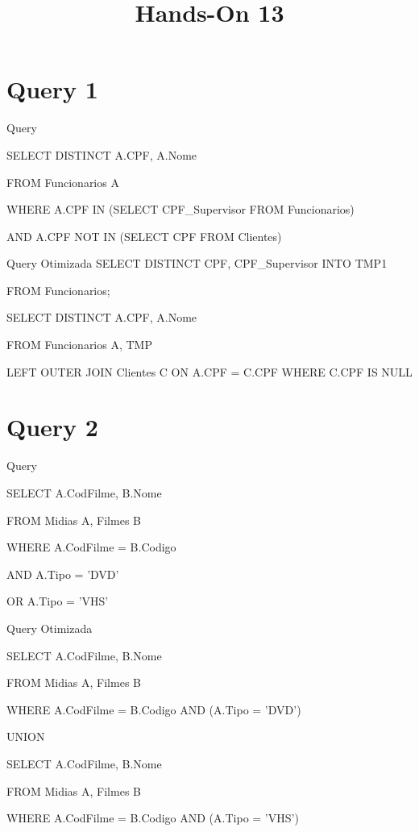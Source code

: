 \documentclass[aspectratio=169]{beamer}
\title{Hands-On 13}
\begin{document}
    \begin{frame}

    \titlepage

    \end{frame}

    \section{Query 1}

    \begin{frame}{Query}

      SELECT DISTINCT A.CPF, A.Nome

      FROM Funcionarios A

      WHERE A.CPF IN (SELECT CPF\_Supervisor FROM Funcionarios)

      AND A.CPF NOT IN (SELECT CPF FROM Clientes)

    \end{frame}
    \begin{frame}{Query Otimizada}
      SELECT DISTINCT CPF, CPF\_Supervisor INTO TMP1

      FROM Funcionarios;

      SELECT DISTINCT A.CPF, A.Nome

      FROM Funcionarios A, TMP

      LEFT OUTER JOIN Clientes C ON A.CPF = C.CPF WHERE C.CPF IS NULL
    \end{frame}
    \section{Query 2}

    \begin{frame}{Query}

        SELECT A.CodFilme, B.Nome

        FROM Midias A, Filmes B

        WHERE A.CodFilme = B.Codigo

        AND A.Tipo = 'DVD'

        OR A.Tipo = 'VHS'

    \end{frame}
    \begin{frame}{Query Otimizada}

        SELECT A.CodFilme, B.Nome

        FROM Midias A, Filmes B

        WHERE A.CodFilme = B.Codigo AND (A.Tipo = 'DVD')

        UNION

        SELECT A.CodFilme, B.Nome

        FROM Midias A, Filmes B

        WHERE A.CodFilme = B.Codigo AND (A.Tipo = 'VHS')

    \end{frame}
\end{document}
